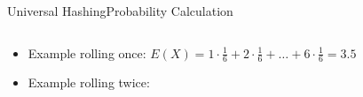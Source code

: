 \begin{frame}{Universal Hashing}{Probability Calculation}
\begin{columns}
\begin{column}{0.5\linewidth}
\begin{table}[!h]
   \end{table}
   \end{column}
 \end{columns}
 \begin{itemize}
 \vspace*{-1.0em}
 \item<4-> Example rolling once: 
  {\color{Mittel-Blau}$E(X) = 1 \cdot \frac{1}{6} + 2 \cdot \frac{1}{6}
    + \dots + 6 \cdot \frac{1}{6} = 3.5$}
 \item<6-> Example rolling twice: 
   \end{itemize}
\end{frame}





